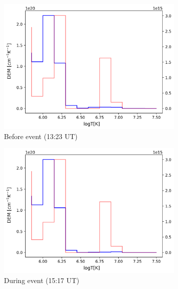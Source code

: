 \begin{figure}[h!]

    \begin{subfigure}[b]{0.3\textwidth}
        \centering
        \includegraphics[width=\textwidth]{images/dem_profile_before_event_2021_oct_28.png}
        \caption{Before event (13:23 UT)}
    \end{subfigure}
    \hfill
    \begin{subfigure}[b]{0.3\textwidth}
        \centering
        \includegraphics[width=\textwidth]{images/dem_profile_during_event_2021_oct_28.png}
        \caption{During event (15:17 UT)}
    \end{subfigure}
    \hfill
    \begin{subfigure}[b]{0.3\textwidth}

\end{subfigure}
\end{figure}
